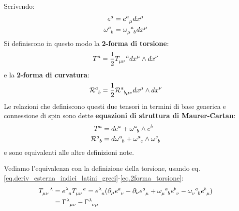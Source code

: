 Scrivendo:
\begin{align}
    e^a &= \tensor{e}{^a_\mu}dx^\mu \\
    \tensor{\omega}{^a_b} &= \tensor{\omega}{_\mu^a_b}dx^\mu
\end{align}
Si definiscono in questo modo la \textbf{2-forma di torsione}:
\begin{equation}
    T^a = \frac{1}{2}\tensor{T}{_{\mu\nu}^a}dx^\mu \wedge dx^\nu
    \label{eq.2forma_torsione}
\end{equation}
e la \textbf{2-forma di curvatura}:
\begin{equation}
    \tensor{\mathcal R}{^a_b} = \frac{1}{2}\tensor{\mathcal R}{^a_{b\mu\nu}}dx^\mu \wedge dx^\nu
    \label{eq.2forma_curvatura}
\end{equation}
Le relazioni che definiscono questi due tensori in termini di base generica e connessione di spin sono dette \textbf{equazioni di struttura di Maurer-Cartan}:
\begin{align}
    T^a &= de^a + \tensor{\omega}{^a_b}\wedge e^b \label{eq.maurer_cartan_torsione} \\
    \tensor{\mathcal R}{^a_b} &= d\tensor{\omega}{^a_b} + \tensor{\omega}{^a_c}\wedge\tensor{\omega}{^c_b} \label{eq.maurer_cartan_riemann}
\end{align}
e sono equivalenti alle altre definizioni note.

Vediamo l'equivalenza con la definizione della torsione, usando eq. \ref{eq.deriv_esterna_indici_latini_greci}-\ref{eq.2forma_torsione}:
\begin{align*}
    \tensor{T}{_{\mu\nu}^\lambda} &= \tensor{e}{^\lambda_a}\tensor{T}{_{\mu\nu}^a} =\tensor{e}{^\lambda_a}(\partial_\mu \tensor{e}{^a_\nu} - \partial_\nu \tensor{e}{^a_\mu} + \tensor{\omega}{_\mu^a_b}\tensor{e}{^b_\nu} - \tensor{\omega}{_\nu^a_b}\tensor{e}{^b_\mu} )\\
    &= \tensor{\Gamma}{^\lambda_{\mu\nu}} - \tensor{\Gamma}{^\lambda_{\nu\mu}}
\end{align*}

